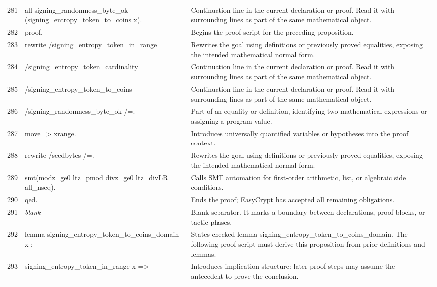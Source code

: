 \documentclass[10pt]{article}
\begin{document}
\begin{longtable}{r L{0.53\textwidth} L{0.37\textwidth}}
281 & {\ttfamily\scriptsize   all signing\_randomness\_byte\_ok (signing\_entropy\_token\_to\_coins x).} & Continuation line in the current declaration or proof.  Read it with surrounding lines as part of the same mathematical object. \\
282 & {\ttfamily\scriptsize proof.} & Begins the proof script for the preceding proposition. \\
283 & {\ttfamily\scriptsize rewrite /signing\_entropy\_token\_in\_range} & Rewrites the goal using definitions or previously proved equalities, exposing the intended mathematical normal form. \\
284 & {\ttfamily\scriptsize         /signing\_entropy\_token\_cardinality} & Continuation line in the current declaration or proof.  Read it with surrounding lines as part of the same mathematical object. \\
285 & {\ttfamily\scriptsize         /signing\_entropy\_token\_to\_coins} & Continuation line in the current declaration or proof.  Read it with surrounding lines as part of the same mathematical object. \\
286 & {\ttfamily\scriptsize         /signing\_randomness\_byte\_ok /=.} & Part of an equality or definition, identifying two mathematical expressions or assigning a program value. \\
287 & {\ttfamily\scriptsize move=> xrange.} & Introduces universally quantified variables or hypotheses into the proof context. \\
288 & {\ttfamily\scriptsize rewrite /seedbytes /=.} & Rewrites the goal using definitions or previously proved equalities, exposing the intended mathematical normal form. \\
289 & {\ttfamily\scriptsize smt(modz\_ge0 ltz\_pmod divz\_ge0 ltz\_divLR all\_nseq).} & Calls SMT automation for first-order arithmetic, list, or algebraic side conditions. \\
290 & {\ttfamily\scriptsize qed.} & Ends the proof; EasyCrypt has accepted all remaining obligations. \\
291 & {\ttfamily\scriptsize \emph{blank}} & Blank separator.  It marks a boundary between declarations, proof blocks, or tactic phases. \\
292 & {\ttfamily\scriptsize lemma signing\_entropy\_token\_to\_coins\_domain x :} & States checked lemma signing\_entropy\_token\_to\_coins\_domain.  The following proof script must derive this proposition from prior definitions and lemmas. \\
293 & {\ttfamily\scriptsize   signing\_entropy\_token\_in\_range x =>} & Introduces implication structure: later proof steps may assume the antecedent to prove the conclusion. \\

\end{longtable}
\end{document}
